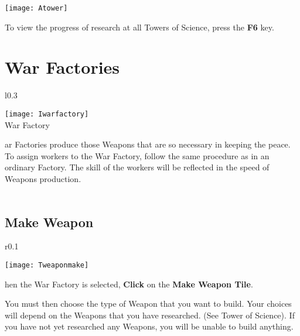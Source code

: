 \begin{center}
    \texttt{[image: Atower]} %
\end{center}

To view the progress of research at all Towers of Science, press the \textbf{F6} key.

\section{\textsf{War Factories}}


\begin{wrapfigure}{l}{0.3\textwidth}
    \vspace{-20pt}
    \begin{center}
        \texttt{[image: Iwarfactory]} %
        \\ War Factory
    \end{center}
    \vspace{-30pt}
\end{wrapfigure}

ar Factories produce those Weapons that are so necessary in keeping the peace. To assign workers to the War Factory, follow the same procedure as in an ordinary Factory. The skill of the workers will be reflected in the speed of Weapons production. \\ \\ %

\subsection{\textsf{Make Weapon}}


\begin{wrapfigure}{r}{0.1\textwidth}
    \vspace{-20pt}
    \begin{center}
        \texttt{[image: Tweaponmake]}
    \end{center}
    \vspace{-20pt}
\end{wrapfigure}

hen the War Factory is selected, \textbf{Click} on the \textbf{Make Weapon Tile}.

You must then choose the type of Weapon that you want to build. Your choices will depend on the Weapons that you have researched. (See Tower of Science). If you have not yet researched any Weapons, you will be unable to build anything.

